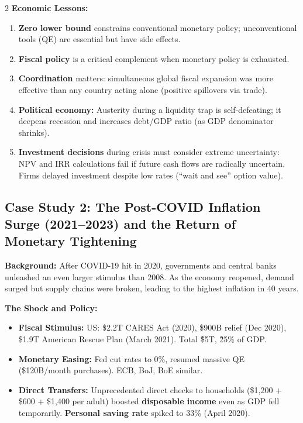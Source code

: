 \documentclass[10pt,a4paper]{article}
\begin{document}
\begin{multicols}{2}
\textbf{Economic Lessons:}
\begin{enumerate}[leftmargin=*,nosep]
    \item \textbf{Zero lower bound} constrains conventional monetary policy; unconventional tools (QE) are essential but have side effects.
    \item \textbf{Fiscal policy} is a critical complement when monetary policy is exhausted.
    \item \textbf{Coordination} matters: simultaneous global fiscal expansion was more effective than any country acting alone (positive spillovers via trade).
    \item \textbf{Political economy:} Austerity during a liquidity trap is self-defeating; it deepens recession and increases debt/GDP ratio (as GDP denominator shrinks).
    \item \textbf{Investment decisions} during crisis must consider extreme uncertainty: NPV and IRR calculations fail if future cash flows are radically uncertain. Firms delayed investment despite low rates (``wait and see'' option value).
\end{enumerate}

\subsection*{Case Study 2: The Post-COVID Inflation Surge (2021--2023) and the Return of Monetary Tightening}

\textbf{Background:} After COVID-19 hit in 2020, governments and central banks unleashed an even larger stimulus than 2008. As the economy reopened, demand surged but supply chains were broken, leading to the highest inflation in 40 years.

\textbf{The Shock and Policy:}
\begin{itemize}[leftmargin=*,nosep]
    \item \textbf{Fiscal Stimulus:} US: \$2.2T CARES Act (2020), \$900B relief (Dec 2020), \$1.9T American Rescue Plan (March 2021). Total \~ \$5T, \~ 25\% of GDP.
    \item \textbf{Monetary Easing:} Fed cut rates to 0\%, resumed massive QE (\$120B/month purchases). ECB, BoJ, BoE similar.
    \item \textbf{Direct Transfers:} Unprecedented direct checks to households (\$1,200 + \$600 + \$1,400 per adult) boosted \textbf{disposable income} even as GDP fell temporarily. \textbf{Personal saving rate} spiked to 33\% (April 2020).
\end{itemize}


\end{multicols}
\end{document}
